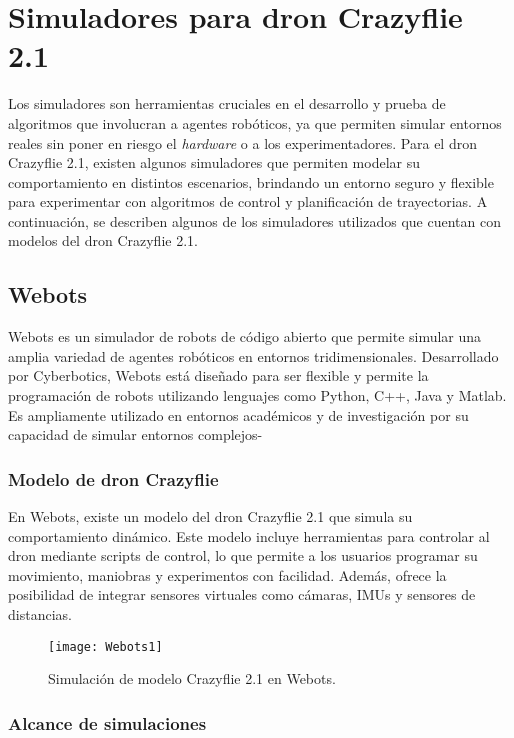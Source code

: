 \newpage
\section{Simuladores para dron Crazyflie 2.1}
Los simuladores son herramientas cruciales en el desarrollo y prueba de algoritmos que involucran a agentes robóticos, ya que permiten simular entornos reales sin poner en riesgo el \textit{hardware} o a los experimentadores. Para el dron Crazyflie 2.1, existen algunos simuladores que permiten modelar su comportamiento en distintos escenarios, brindando un entorno seguro y flexible para experimentar con algoritmos de control y planificación de trayectorias. A continuación, se describen algunos de los simuladores utilizados que cuentan con modelos del dron Crazyflie 2.1.

\subsection{Webots}
Webots es un simulador de robots de código abierto que permite simular una amplia variedad de agentes robóticos en entornos tridimensionales. Desarrollado por Cyberbotics, Webots está diseñado para ser flexible y permite la programación de robots utilizando lenguajes como Python, C++, Java y Matlab. Es ampliamente utilizado en entornos académicos y de investigación por su capacidad de simular entornos complejos-

\subsubsection{Modelo de dron Crazyflie}
En Webots, existe un modelo del dron Crazyflie 2.1 que simula su comportamiento dinámico. Este modelo incluye herramientas para controlar al dron mediante scripts de control, lo que permite a los usuarios programar su movimiento, maniobras y experimentos con facilidad. Además, ofrece la posibilidad de integrar sensores virtuales como cámaras, IMUs y sensores de distancias.

\begin{figure}[htbp]
	\centering
	\texttt{[image: Webots1]}
	\caption{Simulación de modelo Crazyflie 2.1 en Webots.}
	\label{fig:Webots1}
\end{figure} 


\subsubsection{Alcance de simulaciones}


